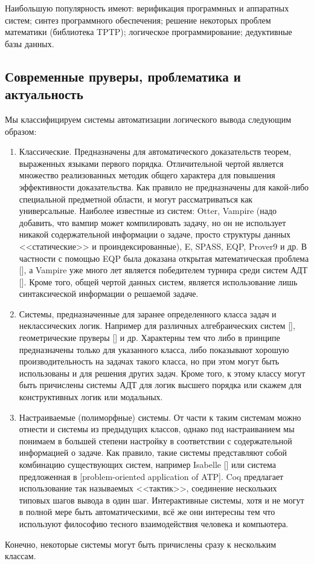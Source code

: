 Наибольшую популярность имеют: верификация программных и аппаратных систем; синтез программного обеспечения; решение некоторых проблем математики (библиотека TPTP); логическое программирование; дедуктивные базы данных. %

\subsection{Современные пруверы, проблематика и актуальность}

Мы классифицируем системы автоматизации логического вывода следующим образом:
\begin{enumerate}
\item Классические. Предназначены для автоматического доказательств теорем, выраженных языками первого порядка. Отличительной чертой является множество реализованных методик общего характера для повышения эффективности доказательства. Как правило не предназначены для какой-либо специальной предметной области, и могут рассматриваться как универсальные. Наиболее известные из систем: Otter, Vampire (надо добавить, что вампир может компилировать задачу, но он не использует никакой содержательной информации о задаче, просто структуры данных <<статические>> и проиндексированные), E, SPASS, EQP, Prover9 и др.  В частности  с помощью EQP была доказана открытая математическая проблема [], а Vampire уже много лет является победителем турнира среди систем АДТ []. Кроме того, общей чертой данных систем, является использование лишь синтаксической информации о решаемой задаче.

\item Системы, предназначенные для заранее определенного класса задач и неклассических логик. Например для различных алгебраических систем [], геометрические пруверы [] и др. Характерны тем что либо в принципе предназначены только для указанного класса, либо показывают хорошую производительность на задачах такого класса, но при этом могут быть использованы и для решения других задач. Кроме того, к этому классу могут быть причислены системы АДТ для логик высшего порядка или скажем для конструктивных логик или модальных.

\item Настраиваемые (полиморфные) системы. От части к таким системам можно отнести и системы из предыдущих классов, однако под настраиванием мы понимаем в большей степени настройку в соответствии с содержательной информацией о задаче. Как правило, такие системы представляют собой комбинацию существующих систем, например Isabelle [] или система предложенная в [problem-oriented application of ATP]. Coq предлагает использование так называемых <<тактик>>, соединение нескольких типовых шагов вывода в один шаг. Интерактивные системы, хотя и не могут в полной мере быть автоматическими, всё же они интересны тем что используют философию тесного взаимодействия человека и компьютера.
\end{enumerate}
Конечно, некоторые системы могут быть причислены сразу к нескольким классам.


